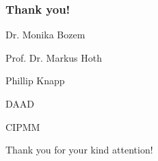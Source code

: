 \documentclass{beamer}
\begin{document}
\begin{frame} %

\centering
\frametitle{Thank you!}

Dr. Monika Bozem

Prof. Dr. Markus Hoth

Phillip Knapp

DAAD

CIPMM

\vspace{1 cm}

Thank you for your kind attention!

\end{frame}
\end{document}
